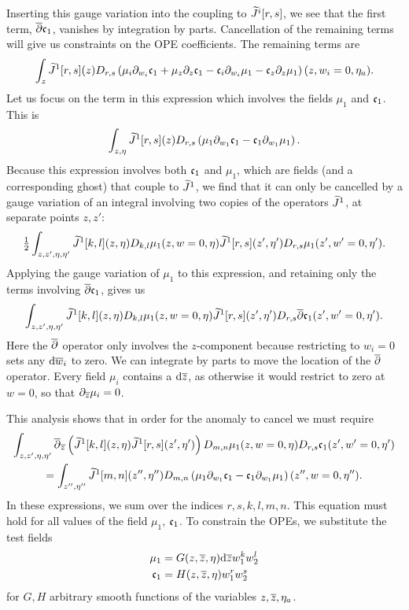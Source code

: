 \documentclass[../main.tex]{subfiles}
\begin{document}
Inserting this gauge variation into the coupling to $\widetilde{J}^i[r,s]$, we see that the first term, $\overline{\partial} \mathfrak{c}_1$, vanishes by integration by parts.  
Cancellation of the remaining terms will give us constraints on the OPE coefficients.
The remaining terms are 
\[ 
	\int_{z} \widetilde{J}^1[r,s] (z)  D_{r,s}\left( \mu_i \partial_{w_i} \mathfrak{c}_1 + \mu_z \partial_{z} \mathfrak{c}_1 - \mathfrak{c}_i \partial_{w_i} \mu_1 - \mathfrak{c}_z \partial_z \mu_1 \right)(z,w_i = 0, \eta_a). 
\]
Let us focus on the term in this expression which involves the fields $\mu_1$ and $\mathfrak{c}_1$. This is 
\[ 
	 \int_{z,\eta} \widetilde{J}^1[r,s] (z)  D_{r,s}\left( \mu_1 \partial_{w_1} \mathfrak{c}_1   - \mathfrak{c}_1 \partial_{w_1} \mu_1  \right). 
\]
Because this expression involves both $\mathfrak{c}_1$ and $\mu_1$, which are fields (and a corresponding ghost) that couple to $\widetilde{J}^1$, we find that it can only be cancelled by a gauge variation of an integral involving two copies of the operators $\widetilde{J}^1$, at separate points $z,z'$:  
\[ 
	\tfrac{1}{2} \int_{z,z', \eta,\eta'} \widetilde{J}^1[k,l] (z,\eta) D_{k,l} \mu_1(z, w=0, \eta)  \widetilde{J}^1[r,s] (z',\eta') D_{r,s} \mu_1(z', w' = 0, \eta') . 
\]
Applying the gauge variation of $\mu_1$ to this expression, and retaining only the terms involving $\overline{\partial} \mathfrak{c}_1$, gives us
\[ 
	\int_{z,z', \eta,\eta'} \widetilde{J}^1[k,l] (z,\eta) D_{k,l} \mu_1(z, w = 0, \eta)  \widetilde{J}^1[r,s] (z',\eta') D_{r,s} \overline{\partial} \mathfrak{c}_1 (z', w' = 0, \eta') . 
\]
Here the $\overline{\partial}$ operator only involves the $z$-component because restricting to $w_i= 0$ sets any $\mathrm{d} \overline{w}_i$ to zero. We can integrate by parts to move the location of the $\overline{\partial}$ operator. Every field $\mu_i$ contains a $\mathrm{d} {\overline{z}}$, as otherwise it would restrict to zero at $w = 0$, so that $\partial_{{\overline{z}}} \mu_i = 0$. 

This analysis shows that in order for the anomaly to cancel we must require
\begin{multline} 
	\int_{z,z', \eta,\eta'} \overline{\partial}_{{\overline{z}}} \left( \widetilde{J}^1[k,l] (z,\eta)  \widetilde{J}^1[r,s] (z',\eta') \right)  D_{m,n} \mu_1(z, w = 0, \eta)  D_{r,s}  \mathfrak{c}_1 (z', w' = 0, \eta')  \\
	= \int_{z'',\eta''} \widetilde{J}^1[m,n] (z'',\eta'')  D_{m,n}\left( \mu_1 \partial_{w_1} \mathfrak{c}_1   - \mathfrak{c}_1 \partial_{w_1} \mu_1  \right)(z'',w = 0, \eta'').   
\end{multline}
In these expressions, we sum over the indices $r,s,k,l,m,n$.  This equation must hold for all values of the field $\mu_1$, $\mathfrak{c}_1$. To constrain the OPEs, we substitute the test fields
\begin{align*}
\mu_1 & = G(z,{\overline{z}},\eta) \mathrm{d} {\overline{z}} w_1^k w_2^l \\
\mathfrak{c}_1 & = H(z,{\overline{z}},\eta) w_1^r w_2^s
\end{align*}
for $G,H$ arbitrary smooth functions of the variables $z,{\overline{z}},\eta_a$. 
\end{document}

